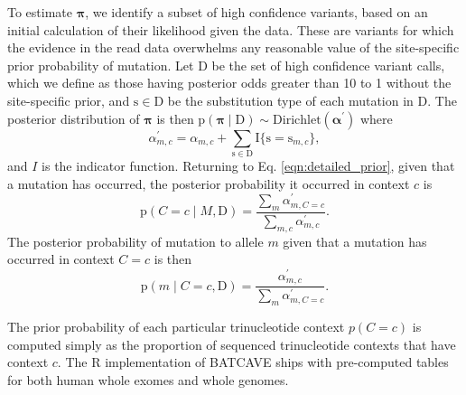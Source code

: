 \documentclass[a4,center,fleqn]{NAR}
\newcommand{\batcave}{BATCAVE\xspace}
\begin{document}
To estimate $\boldsymbol{\pi}$, we identify a subset of high confidence variants, based on an initial calculation of their likelihood given the data.
These are variants for which the evidence in the read data overwhelms any reasonable value of the site-specific prior probability of mutation.
Let $\mathrm{D}$ be the set of high confidence variant calls, which we define as those having posterior odds greater than 10 to 1 without the site-specific prior, and $\mathrm{s} \in \mathrm{D}$ be the substitution type of each mutation in $\mathrm{D}$.
The posterior distribution of $\boldsymbol{\pi}$ is then $\mathrm{p}(\boldsymbol{\pi} \mid \mathrm{D}) \sim \textrm{Dirichlet}(\boldsymbol{\alpha^{\prime}})$ where
\begin{equation}
    \alpha^{\prime}_{m,c} = \alpha_{m,c} + \sum\limits_{\mathrm{s} \in \mathrm{D}} \mathrm{I}\{\mathrm{s} = \mathrm{s}_{m,c}\},
\end{equation}
and $I$ is the indicator function.
Returning to Eq. \ref{eqn:detailed_prior}, given that a mutation has occurred, the posterior probability it occurred in context $c$ is
\begin{equation}
  \label{eqn:post_pred}
  \mathrm{p}(C = c \mid M,\mathrm{D}) = \frac{\sum_{m}\alpha^{\prime}_{m,C = c}}{\sum_{m,c}\alpha^{\prime}_{m,c}}.
\end{equation}
The posterior probability of mutation to allele $m$ given that a mutation has occurred in context $C = c$ is then
\begin{equation}
  \label{eqn:to_allele}
   \mathrm{p}(m \mid C = c,\mathrm{D}) = \frac{\alpha^{\prime}_{m,c}}{\sum_{m} \alpha^{\prime}_{m,C = c}}.
\end{equation}

The prior probability of each particular trinucleotide context $p(C = c)$ is computed simply as the proportion of sequenced trinucleotide contexts that have context $c$.
The R implementation of \batcave ships with pre-computed tables for both human whole exomes and whole genomes.
\end{document}
